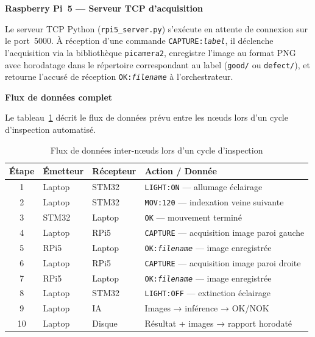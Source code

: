 \medskip
\noindent\textbf{Raspberry Pi~5 — Serveur TCP d'acquisition}

Le serveur TCP Python (\texttt{rpi5\_server.py}) s'exécute en attente de connexion sur le
port~5000. À réception d'une commande \texttt{CAPTURE:\textit{label}}, il déclenche
l'acquisition via la bibliothèque \texttt{picamera2}, enregistre l'image au format PNG avec
horodatage dans le répertoire correspondant au label (\texttt{good/} ou \texttt{defect/}),
et retourne l'accusé de réception \texttt{OK:\textit{filename}} à l'orchestrateur.

\medskip
\noindent\textbf{Flux de données complet}

Le tableau~\ref{tab:flux_donnees} décrit le flux de données prévu entre les nœuds lors
d'un cycle d'inspection automatisé.

\begin{table}[htbp]
\caption{Flux de données inter-nœuds lors d'un cycle d'inspection}
\label{tab:flux_donnees}
\centering
\small
\renewcommand{\arraystretch}{1.4}
\begin{tabular}{|c|l|l|l|}
\hline
\rowcolor{navyblue}
\textbf{\color{white}Étape} & \textbf{\color{white}Émetteur} & \textbf{\color{white}Récepteur} & \textbf{\color{white}Action / Donnée} \\
\hline
1 & Laptop & STM32 & \texttt{LIGHT:ON} — allumage éclairage \\
\hline
2 & Laptop & STM32 & \texttt{MOV:120} — indexation veine suivante \\
\hline
3 & STM32  & Laptop & \texttt{OK} — mouvement terminé \\
\hline
4 & Laptop & RPi5   & \texttt{CAPTURE} — acquisition image paroi gauche \\
\hline
5 & RPi5   & Laptop & \texttt{OK:\textit{filename}} — image enregistrée \\
\hline
6 & Laptop & RPi5   & \texttt{CAPTURE} — acquisition image paroi droite \\
\hline
7 & RPi5   & Laptop & \texttt{OK:\textit{filename}} — image enregistrée \\
\hline
8 & Laptop & STM32  & \texttt{LIGHT:OFF} — extinction éclairage \\
\hline
9 & Laptop & IA     & Images → inférence → OK/NOK \\
\hline
10& Laptop & Disque & Résultat + images → rapport horodaté \\
\hline
\end{tabular}
\end{table}

